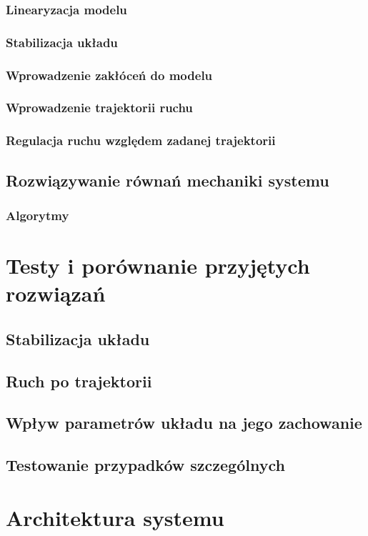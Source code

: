 \documentclass[12pt, oneside]{report}
\theoremstyle{definition}
\begin{document}
\subsection{Linearyzacja modelu}
\subsection{Stabilizacja układu}
\subsection{Wprowadzenie zakłóceń do modelu}
\subsection{Wprowadzenie trajektorii ruchu}
\subsection{Regulacja ruchu względem zadanej trajektorii}
\section{Rozwiązywanie równań mechaniki systemu}
\subsection{Algorytmy}


\chapter{Testy i porównanie przyjętych rozwiązań}
\section{Stabilizacja układu}
\section{Ruch po trajektorii}
\section{Wpływ parametrów układu na jego zachowanie}
\section{Testowanie przypadków szczególnych}


\chapter{Architektura systemu}
\end{document}
